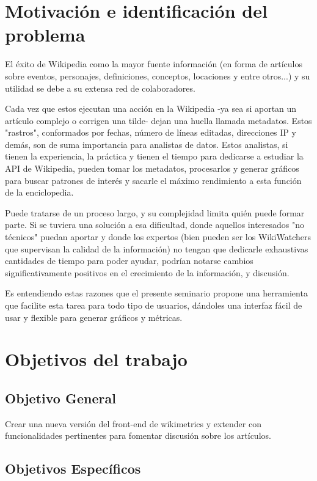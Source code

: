 


\section{Motivación e identificación del problema}

El éxito de Wikipedia como la mayor fuente información (en forma de artículos sobre eventos, personajes, definiciones, conceptos, locaciones y entre otros...) y su utilidad se debe a su extensa red de colaboradores.

Cada vez que estos ejecutan una acción en la Wikipedia -ya sea si aportan un artículo complejo o corrigen una tilde- dejan una huella llamada metadatos. Estos "rastros", conformados por fechas, número de líneas editadas, direcciones IP y demás, son de suma importancia para analistas de datos. Estos analistas, si tienen la experiencia, la práctica y tienen el tiempo para dedicarse a estudiar la API de Wikipedia, pueden tomar los metadatos, procesarlos y generar gráficos para buscar patrones de interés y sacarle el máximo rendimiento a esta función de la enciclopedia.

Puede tratarse de un proceso largo, y su complejidad limita quién puede formar parte. Si se tuviera una solución a esa dificultad, donde aquellos interesados "no técnicos" puedan aportar y donde los expertos (bien pueden ser los WikiWatchers que supervisan la calidad de la información) no tengan que dedicarle exhaustivas cantidades de tiempo para poder ayudar, podrían notarse cambios significativamente positivos en el crecimiento de la información, y discusión.

Es entendiendo estas razones que el presente seminario propone una herramienta que facilite esta tarea para todo tipo de usuarios, dándoles una interfaz fácil de usar y flexible para generar gráficos y métricas.

\section{Objetivos del trabajo}

\subsection{Objetivo General}
Crear una nueva versión del front-end de wikimetrics y extender con funcionalidades pertinentes para fomentar discusión sobre los artículos.

\subsection{Objetivos Específicos}

